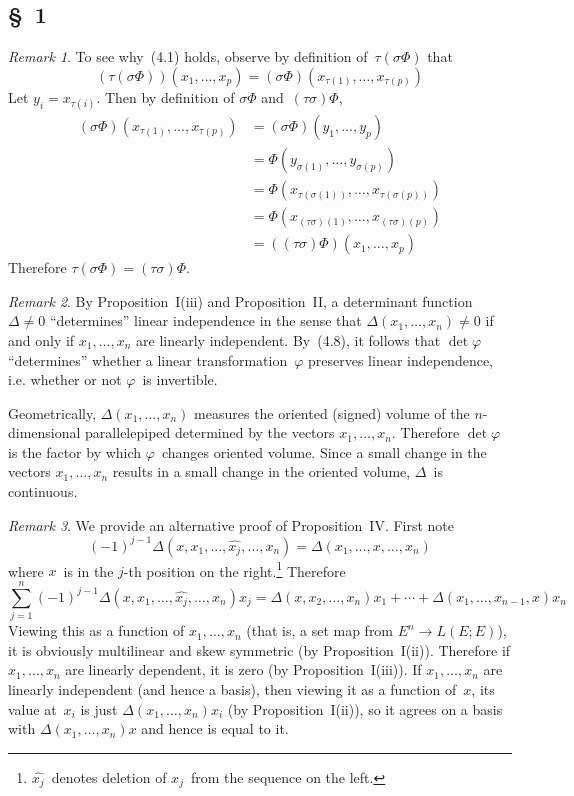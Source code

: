 \documentclass[letterpaper,12pt]{article}
\newcommand{\delete}{\widehat}
\theoremstyle{definition}
\theoremstyle{remark}
\newtheorem*{rmk}{Remark}
\begin{document}
\subsection*{\S~1}
\begin{rmk} To see why~(4.1) holds, observe by definition of~\(\tau(\sigma\Phi)\) that
\[(\tau(\sigma\Phi))(x_1,\ldots,x_p)=(\sigma\Phi)(x_{\tau(1)},\ldots,x_{\tau(p)})\]
Let \(y_i=x_{\tau(i)}\). Then by definition of \(\sigma\Phi\) and~\((\tau\sigma)\Phi\),
\begin{align*}
(\sigma\Phi)(x_{\tau(1)},\ldots,x_{\tau(p)})&=(\sigma\Phi)(y_1,\ldots,y_p)\\
	&=\Phi(y_{\sigma(1)},\ldots,y_{\sigma(p)})\\
	&=\Phi(x_{\tau(\sigma(1))},\ldots,x_{\tau(\sigma(p))})\\
	&=\Phi(x_{(\tau\sigma)(1)},\ldots,x_{(\tau\sigma)(p)})\\
	&=((\tau\sigma)\Phi)(x_1,\ldots,x_p)
\end{align*}
Therefore \(\tau(\sigma\Phi)=(\tau\sigma)\Phi\).
\end{rmk}

\begin{rmk}
By Proposition~I(iii) and Proposition~II, a determinant function \(\Delta\ne 0\) ``determines'' linear independence in the sense that \(\Delta(x_1,\ldots,x_n)\ne0\) if and only if \(x_1,\ldots,x_n\) are linearly independent. By~(4.8), it follows that \(\det\varphi\) ``determines'' whether a linear transformation~\(\varphi\) preserves linear independence, i.e. whether or not \(\varphi\)~is invertible.

Geometrically, \(\Delta(x_1,\ldots,x_n)\) measures the oriented (signed) volume of the \(n\)-dimensional parallelepiped determined by the vectors \(x_1,\ldots,x_n\). Therefore \(\det\varphi\) is the factor by which \(\varphi\)~changes oriented volume. Since a small change in the vectors \(x_1,\ldots,x_n\) results in a small change in the oriented volume, \(\Delta\)~is continuous.
\end{rmk}

\begin{rmk}
We provide an alternative proof of Proposition~IV. First note
\[(-1)^{j-1}\Delta(x,x_1,\ldots,\delete{x_j},\ldots,x_n)=\Delta(x_1,\ldots,x,\ldots,x_n)\]
where \(x\)~is in the \(j\)-th position on the right.\footnote{\(\delete{x_j}\)~denotes deletion of \(x_j\)~from the sequence on the left.} Therefore
\[\sum_{j=1}^n(-1)^{j-1}\Delta(x,x_1,\ldots,\delete{x_j},\ldots,x_n)x_j=\Delta(x,x_2,\ldots,x_n)x_1+\cdots+\Delta(x_1,\ldots,x_{n-1},x)x_n\]
Viewing this as a function of \(x_1,\ldots,x_n\) (that is, a set map from \(E^n\to L(E;E)\)), it is obviously multilinear and skew symmetric (by Proposition~I(ii)). Therefore if \(x_1,\ldots,x_n\) are linearly dependent, it is zero (by Proposition~I(iii)). If \(x_1,\ldots,x_n\) are linearly independent (and hence a basis), then viewing it as a function of~\(x\), its value at~\(x_i\) is just \(\Delta(x_1,\ldots,x_n)x_i\) (by Proposition~I(ii)), so it agrees on a basis with \(\Delta(x_1,\ldots,x_n)x\) and hence is equal to it.
\end{rmk}
\end{document}
